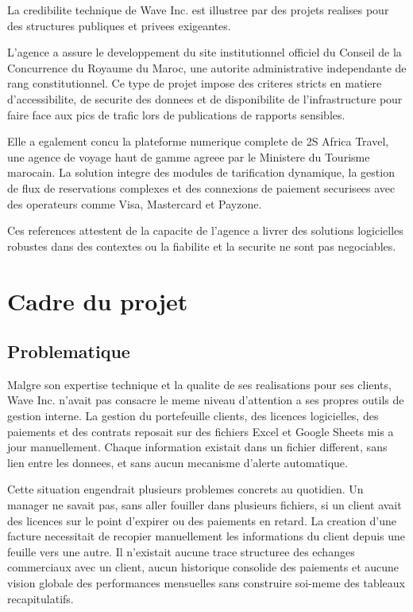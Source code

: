 \documentclass[12pt, a4paper]{report}
\begin{document}
La credibilite technique de Wave Inc. est illustree par des projets realises
pour des structures publiques et privees exigeantes.

L'agence a assure le developpement du site institutionnel officiel du Conseil
de la Concurrence du Royaume du Maroc, une autorite administrative independante
de rang constitutionnel. Ce type de projet impose des criteres stricts en
matiere d'accessibilite, de securite des donnees et de disponibilite de
l'infrastructure pour faire face aux pics de trafic lors de publications de
rapports sensibles.

Elle a egalement concu la plateforme numerique complete de 2S Africa Travel,
une agence de voyage haut de gamme agreee par le Ministere du Tourisme marocain.
La solution integre des modules de tarification dynamique, la gestion de flux de
reservations complexes et des connexions de paiement securisees avec des
operateurs comme Visa, Mastercard et Payzone.

Ces references attestent de la capacite de l'agence a livrer des solutions
logicielles robustes dans des contextes ou la fiabilite et la securite ne sont
pas negociables.

\section{Cadre du projet}

\subsection{Problematique}

Malgre son expertise technique et la qualite de ses realisations pour ses
clients, Wave Inc. n'avait pas consacre le meme niveau d'attention a ses propres
outils de gestion interne. La gestion du portefeuille clients, des licences
logicielles, des paiements et des contrats reposait sur des fichiers Excel et
Google Sheets mis a jour manuellement. Chaque information existait dans un
fichier different, sans lien entre les donnees, et sans aucun mecanisme
d'alerte automatique.

Cette situation engendrait plusieurs problemes concrets au quotidien. Un manager
ne savait pas, sans aller fouiller dans plusieurs fichiers, si un client avait
des licences sur le point d'expirer ou des paiements en retard. La creation
d'une facture necessitait de recopier manuellement les informations du client
depuis une feuille vers une autre. Il n'existait aucune trace structuree des
echanges commerciaux avec un client, aucun historique consolide des paiements
et aucune vision globale des performances mensuelles sans construire soi-meme
des tableaux recapitulatifs.
\end{document}
